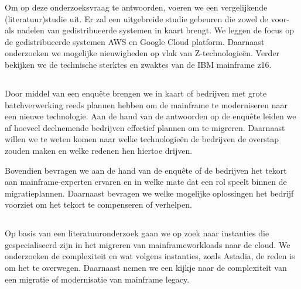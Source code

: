 Om op deze onderzoeksvraag te antwoorden, voeren we een vergelijkende (literatuur)studie uit. Er zal een uitgebreide studie gebeuren die zowel de voor- als nadelen van gedistribueerde systemen in kaart brengt. We leggen de focus op de gedistribueerde systemen AWS en Google Cloud platform. Daarnaast onderzoeken we mogelijke nieuwigheden op vlak van Z-technologieën. Verder bekijken we de technische sterktes en zwaktes van de IBM mainframe z16.

\subsection{}

Door middel van een enquête brengen we in kaart of bedrijven met grote batchverwerking reeds plannen hebben om de mainframe te moderniseren naar een nieuwe technologie. Aan de hand van de antwoorden op de enquête leiden we af hoeveel deelnemende bedrijven effectief plannen om te migreren. Daarnaast willen we te weten komen naar welke technologieën de bedrijven de overstap zouden maken en welke redenen hen hiertoe drijven. 

Bovendien bevragen we aan de hand van de enquête of de bedrijven het tekort aan mainframe-experten ervaren en in welke mate dat een rol speelt binnen de migratieplannen. Daarnaast bevragen we welke mogelijke oplossingen het bedrijf voorziet om het tekort te compenseren of verhelpen. 

\subsection{}

Op basis van een literatuuronderzoek gaan we op zoek naar instanties die gespecialiseerd zijn in het migreren van mainframeworkloads naar de cloud. We onderzoeken de complexiteit en wat volgens instanties, zoals Astadia, de reden is om het te overwegen. Daarnaast nemen we een kijkje naar de complexiteit van een migratie of modernisatie van mainframe legacy. 

